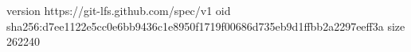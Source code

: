 version https://git-lfs.github.com/spec/v1
oid sha256:d7ee1122e5cc0e6bb9436c1e8950f1719f00686d735eb9d1ffbb2a2297eeff3a
size 262240
